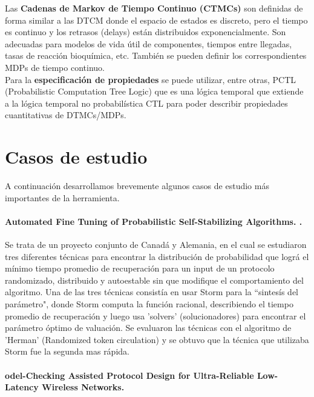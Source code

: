 \documentclass[11pt]{article}
\begin{document}
Las \textbf{Cadenas de Markov de Tiempo Continuo (CTMCs)} son definidas de forma similar a las DTCM donde el espacio de estados es discreto, pero el tiempo es continuo y los retrasos (delays) est\'an distribuidos exponencialmente. Son adecuadas para modelos de vida \'util de componentes, tiempos entre llegadas, tasas de reacci\'on bioqu\'imica, etc. Tambi\'en se pueden definir los correspondientes MDPs de tiempo continuo. \\


Para la \textbf{especificaci\'on de propiedades} se puede utilizar, entre otras, PCTL (Probabilistic Computation Tree Logic) que es una l\'ogica temporal que extiende a la l\'ogica temporal no probabil\'istica CTL para poder describir propiedades cuantitativas de DTMCs/MDPs.

\section{Casos de estudio}

A continuaci\'on desarrollamos brevemente algunos casos de estudio m\'as importantes de la herramienta.
\paragraph{Automated Fine Tuning of Probabilistic Self-Stabilizing Algorithms. \cite{Saba}.}


Se trata de un proyecto conjunto de Canad\'a y Alemania, en el cual se estudiaron tres diferentes t\'ecnicas para encontrar la distribuci\'on de probabilidad que logr\'a el m\'inimo tiempo promedio de recuperaci\'on para un input de un protocolo randomizado, distribuido y autoestable sin que modifique el comportamiento del algoritmo. Una de las tres t\'ecnicas consist\'ia en usar Storm para la ``sintes\'is del par\'ametro", donde Storm computa la funci\'on racional, describiendo el tiempo promedio de recuperaci\'on y luego usa 'solvers' (solucionadores) para encontrar el par\'ametro \'optimo de valuaci\'on. Se evaluaron las t\'ecnicas con el algoritmo de 'Herman' (Randomized token circulation) y se obtuvo que la t\'ecnica que utilizaba Storm fue la segunda mas r\'apida.

\paragraph{odel-Checking Assisted Protocol Design for Ultra-Reliable Low-Latency Wireless Networks. \cite{Christian}}
\end{document}

